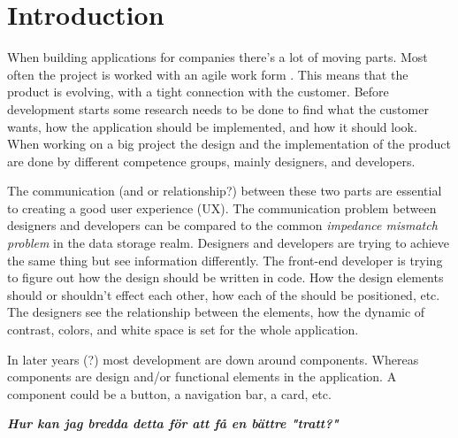 \section{Introduction}




When building applications for companies there's a lot of moving parts. Most often the project is worked with an agile work form \cite{cohen2004introduction}. This means that the product is evolving, with a tight connection with the customer. Before development starts some research needs to be done to find what the customer wants, how the application should be implemented, and how it should look. When working on a big project the design and the implementation of the product are done by different competence groups, mainly designers, and developers. 

The communication (and or relationship?) between these two parts are essential to creating a good user experience (UX). The communication problem between designers and developers can be compared to the common \textit{impedance mismatch problem} in the data storage realm. Designers and developers are trying to achieve the same thing but see information differently. The front-end developer is trying to figure out how the design should be written in code. How the design elements should or shouldn't effect each other, how each of the should be positioned, etc. The designers see the relationship between the elements, how the dynamic of contrast, colors, and white space is set for the whole application. 

In later years (?) most development are down around components. Whereas components are design and/or functional elements in the application. A component could be a button, a navigation bar, a card\cite{babichSimpleDesignTips2020}, etc. 

\textit{ \textbf{Hur kan jag bredda detta för att få en bättre "tratt?"}}




